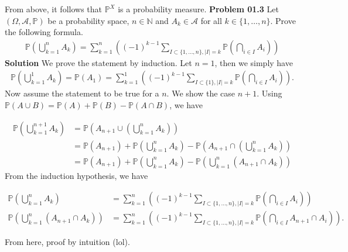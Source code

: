 \documentclass[a4paper]{book}
\theoremstyle{definition}
\begin{document}
From above, it follows that \(\mathbb{P}^X\) is a probability measure.
\newpage
\noindent\textbf{Problem 01.3}
Let \((\Omega, \mathcal{A}, \mathbb{P})\) be a probability space, \(n \in \mathbb{N}\) and \(A_k \in \mathcal{A}\) for all \(k \in \{1, \dots, n\}\). Prove the following formula.
\begin{align}
    \mathbb{P} \left( \bigcup_{k=1}^n A_k \right) = \sum_{k = 1}^n \left( (-1)^{k-1} \sum_{I \subset \{1, \dots, n\}, |I| = k } \mathbb{P} \left( \bigcap_{i \in I} A_i \right) \right)
\end{align}
\newline
\newline
\textbf{Solution}
We prove the statement by induction. Let \(n = 1\), then we simply have
\begin{align}
    \mathbb{P} \left( \bigcup_{k = 1}^1 A_k \right) = \mathbb{P} (A_1) = \sum_{k = 1}^1 \left( (-1)^{k-1} \sum_{I \subset \{1\}, |I| = k } \mathbb{P} \left( \bigcap_{i \in I} A_i \right) \right) \text{.}
\end{align}
Now assume the statement to be true for a \(n\). We show the case \(n + 1\). Using \(\mathbb{P}(A \cup B) = \mathbb{P}(A) + \mathbb{P}(B) - \mathbb{P}(A \cap B)\), we have

\begin{align}
    \mathbb{P} \left( \bigcup_{k=1}^{n+1} A_k \right) &= \mathbb{P} \left( A_{n+1} \cup \left( \bigcup_{k=1}^{n} A_k \right) \right) \\
    &= \mathbb{P} (A_{n+1}) + \mathbb{P} \left( \bigcup_{k=1}^{n} A_k \right) - \mathbb{P} \left( A_{n+1} \cap \left( \bigcup_{k=1}^{n} A_k \right) \right) \\
    &= \mathbb{P} (A_{n+1}) + \mathbb{P} \left( \bigcup_{k=1}^{n} A_k \right) - \mathbb{P} \left( \bigcup_{k=1}^{n} \left( A_{n+1} \cap A_k \right) \right)
\end{align}
From the induction hypothesis, we have

\begin{align}
    \mathbb{P} \left( \bigcup_{k=1}^{n} A_k \right) &= \sum_{k = 1}^n \left( (-1)^{k-1} \sum_{I \subset \{1, \dots, n\}, |I| = k } \mathbb{P} \left( \bigcap_{i \in I} A_i \right) \right) \\
    \mathbb{P} \left( \bigcup_{k=1}^{n} \left( A_{n+1} \cap A_k \right) \right) &= \sum_{k = 1}^n \left( (-1)^{k-1} \sum_{I \subset \{1, \dots, n\}, |I| = k } \mathbb{P} \left( \bigcap_{i \in I} A_{n+1} \cap A_i \right) \right) \text{.}
\end{align}

From here, proof by intuition (lol).
\end{document}
